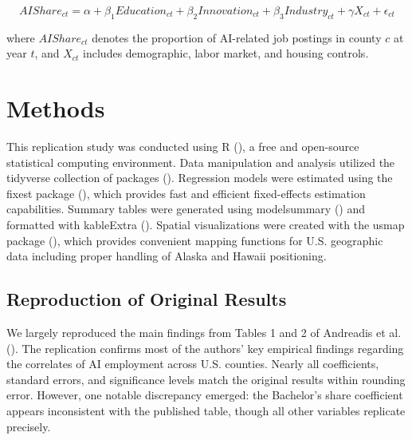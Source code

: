 \documentclass[
]{article}
\begin{document}
\[
AIShare_{ct} = \alpha + \beta_1 Education_{ct} + \beta_2 Innovation_{ct} + \beta_3 Industry_{ct} + \gamma X_{ct} + \epsilon_{ct} \tag{2}
\]

where \(AIShare_{ct}\) denotes the proportion of AI-related job postings
in county \(c\) at year \(t\), and \(X_{ct}\) includes demographic,
labor market, and housing controls.

\section{Methods}\label{methods}

This replication study was conducted using R (), a free and open-source statistical computing
environment. Data manipulation and analysis utilized the tidyverse
collection of packages ().
Regression models were estimated using the fixest package
(), which provides fast and efficient
fixed-effects estimation capabilities. Summary tables were generated
using modelsummary () and
formatted with kableExtra ().
Spatial visualizations were created with the usmap package
(), which provides convenient
mapping functions for U.S. geographic data including proper handling of
Alaska and Hawaii positioning.

\subsection{Reproduction of Original
Results}\label{reproduction-of-original-results}

We largely reproduced the main findings from Tables 1 and 2 of Andreadis
et al. (). The replication confirms
most of the authors' key empirical findings regarding the correlates of
AI employment across U.S. counties. Nearly all coefficients, standard
errors, and significance levels match the original results within
rounding error. However, one notable discrepancy emerged: the Bachelor's
share coefficient appears inconsistent with the published table, though
all other variables replicate precisely.
\end{document}
